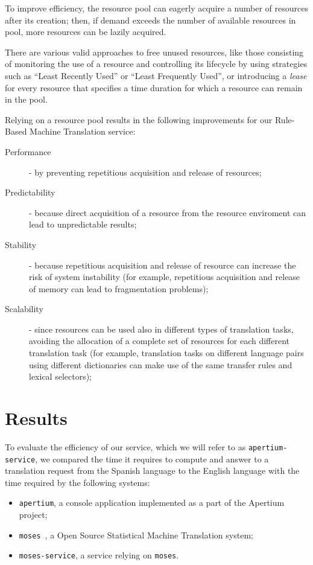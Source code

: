 \documentclass[11pt]{article}
\begin{document}
To improve efficiency, the resource pool can eagerly acquire a number of resources after its creation; then, if demand exceeds the number of available resources in pool, more resources can be lazily acquired.

There are various valid approaches to free unused resources, like those consisting of monitoring the use of a resource and controlling its lifecycle by using  strategies such as ``Least Recently Used'' or ``Least Frequently Used'', or introducing a \emph{lease} for every resource that specifies a time duration for which a resource can remain in the pool.

Relying on a resource pool results in the following improvements for our Rule-Based Machine Translation service:

\begin{description}
 \item[Performance] - by preventing repetitious acquisition and release of resources;
 \item[Predictability] - because direct acquisition of a resource from the resource enviroment can lead to unpredictable results;
 \item[Stability] - because repetitious acquisition and release of resource can increase the risk of system instability (for example, repetitious acquisition and release of memory can lead to fragmentation problems);
 \item[Scalability] - since resources can be used also in different types of translation tasks, avoiding the allocation of a complete set of resources for each different translation task (for example, translation tasks on different language pairs using different dictionaries can make use of the same transfer rules and lexical selectors);
\end{description}

\section{Results}

To evaluate the efficiency of our service, which we will refer to as {\tt apertium-service}, we compared the time it requires to compute and answer to a translation request from the Spanish language to the English language with the time required by the following systems:

\begin{itemize}
 \item {\tt apertium}, a console application implemented as a part of the Apertium project;
 \item {\tt moses}~\citep{moses}, a Open Source Statistical Machine Translation system;
 \item {\tt moses-service}, a service relying on {\tt moses}.
\end{itemize}
\end{document}
